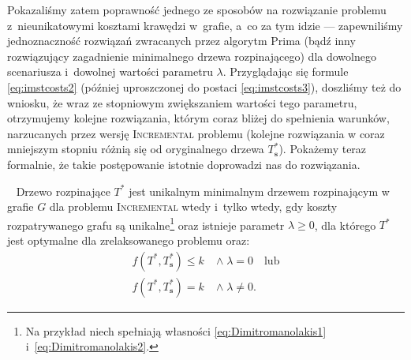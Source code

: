 Pokazaliśmy zatem poprawność jednego ze sposobów na rozwiązanie problemu z~nieunikatowymi kosztami krawędzi w~grafie, a~co za tym idzie --- zapewniliśmy jednoznaczność rozwiązań zwracanych przez algorytm Prima (bądź inny rozwiązujący zagadnienie minimalnego drzewa rozpinającego) dla dowolnego scenariusza i~dowolnej wartości parametru $\lambda$.
Przyglądając się formule \ref{eq:imstcosts2} (później uproszczonej do postaci \ref{eq:imstcosts3}), doszliśmy też do wniosku, że wraz ze stopniowym zwiększaniem wartości tego parametru, otrzymujemy kolejne rozwiązania, którym coraz bliżej do spełnienia warunków, narzucanych przez wersję \textsc{Incremental} problemu (kolejne rozwiązania w coraz mniejszym stopniu różnią się od oryginalnego drzewa $T^{\ast}_{\textbf{s}}$).
Pokażemy teraz formalnie, że takie postępowanie istotnie doprowadzi nas do rozwiązania.

\begin{theorem}~\cite[$589$]{incNetOpt}\label{th:incNetOpt}
	Drzewo rozpinające $T^{\ast}$ jest unikalnym minimalnym drzewem rozpinającym w grafie $G$ dla problemu \textsc{Incremental} wtedy i~tylko wtedy, gdy koszty rozpatrywanego grafu są unikalne\footnote{
		Na przykład niech spełniają własności \ref{eq:Dimitromanolakis1} i~\ref{eq:Dimitromanolakis2}.
	} oraz istnieje parametr $\lambda \geqslant 0$, dla którego $T^{\ast}$ jest optymalne dla zrelaksowanego problemu oraz:
	\begin{align}
		f \left( T^{\ast}, T^{\ast}_{\textbf{s}} \right) \leqslant k \; & \wedge \; \lambda = 0 \quad \text{lub}\label{eq:imstoptcond3}\\
		f \left( T^{\ast}, T^{\ast}_{\textbf{s}} \right) = k \; & \wedge \; \lambda \neq 0\text{.}\label{eq:imstoptcond4}
	\end{align}
\end{theorem}

